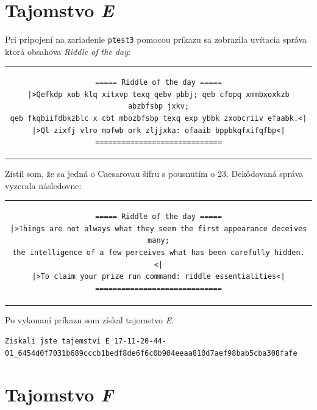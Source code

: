 \documentclass[11pt,a4paper]{article}
\begin{document}
\section{Tajomstvo \textit{E}}\label{sec:E}

Pri pripojení na zariadenie \texttt{ptest3} pomocou príkazu  sa zobrazila uvítacia správa ktorá obsahova \textit{Riddle of the day}:

\begin{center}
\begin{tabular}{c}
\begin{lstlisting}[basicstyle=\footnotesize]
===== Riddle of the day =====
|>Qefkdp xob klq xitxvp texq qebv pbbj; qeb cfopq xmmbxoxkzb abzbfsbp jxkv;
qeb fkqbiifdbkzblc x cbt mbozbfsbp texq exp ybbk zxobcriiv efaabk.<|
|>Ql zixfj vlro mofwb ork zljjxka: ofaaib bppbkqfxifqfbp<|
=============================
\end{lstlisting}
\end{tabular}
\end{center}

Zistil som, že sa jedná o Caesarovau šifru s pousnutím o 23. Dekódovaná správa vyzerala následovne:

\begin{center}
\begin{tabular}{c}
\begin{lstlisting}[basicstyle=\footnotesize]
===== Riddle of the day =====
|>Things are not always what they seem the first appearance deceives many;
the intelligence of a few perceives what has been carefully hidden.<|
|>To claim your prize run command: riddle essentialities<|
=============================
\end{lstlisting}
\end{tabular}
\end{center}

Po vykonaní príkazu  som získal tajomstvo \textit{E}.

\begin{center}
\small{\texttt{Ziskali jste tajemstvi E\_17-11-20-44-01\_6454d0f7031b689cccb1bedf8de6f6c0b904eeaa810d7aef98bab5cba308fafe}}
\end{center}

\section{Tajomstvo \textit{F}}\label{sec:F}
\end{document}
